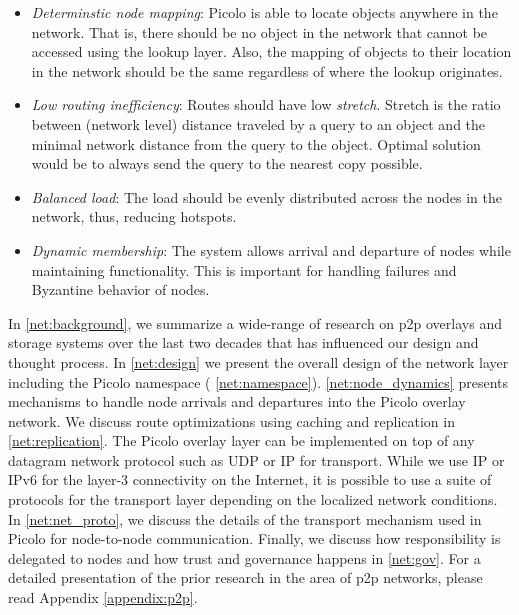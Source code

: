 \begin{itemize}
    \item {\em Determinstic node mapping}: \textsf{Picolo} is able to locate objects anywhere in the network. That is, there
        should be no object in the network that cannot be accessed using the lookup layer. Also, the mapping of objects
        to their location in the network should be the same regardless of where the lookup originates.
    \item {\em Low routing inefficiency}: Routes should have low {\em stretch}. Stretch is the ratio between (network
        level) distance traveled by a query to an object and the minimal network distance from the query to the object.
        Optimal solution would be to always send the query to the nearest copy possible.
    \item {\em Balanced load}: The load should be evenly distributed across the nodes in the network, thus, reducing
        hotspots.
    \item {\em Dynamic membership}: The system allows arrival and departure of nodes while maintaining functionality.
        This is important for handling failures and Byzantine behavior of nodes.
\end{itemize}
In \cref{net:background}, we summarize a wide-range of research on p2p overlays and storage systems
over the last two decades that has influenced our design and thought process. In \cref{net:design} we
present the overall design of the network layer including the \textsf{Picolo} namespace ( \cref{net:namespace}). \cref{net:node_dynamics} presents mechanisms to handle node arrivals and departures into the \textsf{Picolo} overlay network. We discuss route optimizations using caching and replication in \cref{net:replication}.
\newline\newline
The \textsf{Picolo} overlay layer can be implemented on top of any datagram network protocol such as UDP or IP for transport.
While we use IP or IPv6 for the layer-3 connectivity on the Internet, it is possible to use a suite of protocols for the
transport layer depending on the localized network conditions. In \cref{net:net_proto}, we discuss the details of
the transport mechanism used in \textsf{Picolo} for node-to-node communication. Finally, we discuss how responsibility is delegated
to nodes and how trust and governance happens in \cref{net:gov}. For a detailed presentation of the prior research in the area of p2p networks, please read Appendix \cref{appendix:p2p}.

